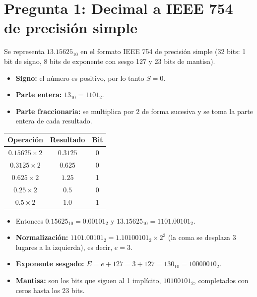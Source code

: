 \documentclass[10pt]{article}
\begin{document}
\newpage
\tableofcontents
\thispagestyle{plain}
\clearpage

\section{Pregunta 1: Decimal a IEEE 754 de precisión simple}
 
Se representa $13.15625_{10}$ en el formato IEEE 754 de precisión simple (32 bits: 1 bit de signo, 8 bits de exponente con sesgo 127 y 23 bits de mantisa).
 
\begin{itemize}
  \item \textbf{Signo:} el número es positivo, por lo tanto $S = 0$.
  \item \textbf{Parte entera:} $13_{10} = 1101_2$.
  \item \textbf{Parte fraccionaria:} se multiplica por 2 de forma sucesiva y se toma la parte entera de cada resultado.
\end{itemize}
 
\begin{center}
\begin{tabular}{c c c}
  \hline
  \textbf{Operación} & \textbf{Resultado} & \textbf{Bit} \\
  \hline
  $0.15625 \times 2$ & $0.3125$ & 0 \\
  $0.3125 \times 2$  & $0.625$  & 0 \\
  $0.625 \times 2$   & $1.25$   & 1 \\
  $0.25 \times 2$    & $0.5$    & 0 \\
  $0.5 \times 2$     & $1.0$    & 1 \\
  \hline
\end{tabular}
\end{center}
 
\begin{itemize}
  \item Entonces $0.15625_{10} = 0.00101_2$ y $13.15625_{10} = 1101.00101_2$.
  \item \textbf{Normalización:} $1101.00101_2 = 1.10100101_2 \times 2^{3}$ (la coma se desplaza 3 lugares a la izquierda), es decir, $e = 3$.
  \item \textbf{Exponente sesgado:} $E = e + 127 = 3 + 127 = 130_{10} = 10000010_2$.
  \item \textbf{Mantisa:} son los bits que siguen al 1 implícito, $10100101_2$, completados con ceros hasta los 23 bits.
\end{itemize}
 
\end{document}
